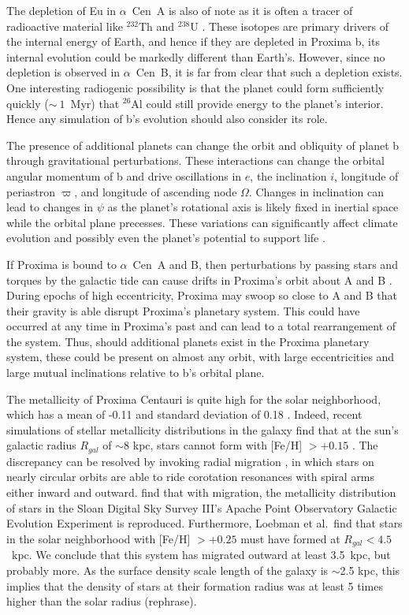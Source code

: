 \documentclass[preprint,12pt]{aastex}
\newcommand{\xxx}[1]{{\color{red} #1}} %
\def\acen{{$\alpha$~Cen}}
\begin{document}
The depletion of Eu in \acen~A is also of note as it is often a tracer
of radioactive material like $^{232}$Th and $^{238}$U
\citep{Young14}. These isotopes are primary drivers of the internal
energy of Earth, and hence if they are depleted in Proxima b, its
internal evolution could be markedly different than Earth's. However,
since no depletion is observed in \acen~B, it is far from clear that
such a depletion exists. One interesting radiogenic possibility is
that the planet could form sufficiently quickly ($\sim~1$~Myr) that
$^{26}$Al could still provide energy to the planet's interior. Hence any
simulation of b's evolution should also consider its role.

The presence of additional planets can change the orbit and obliquity
of planet b through gravitational perturbations. These interactions
can change the orbital angular momentum of b and drive oscillations in
$e$, the inclination $i$, longitude of periastron $\varpi$, and
longitude of ascending node $\Omega$. Changes in inclination can lead
to changes in $\psi$ as the planet's rotational axis is likely fixed
in inertial space while the orbital plane precesses. These variations
can significantly affect climate evolution and possibly even the
planet's potential to support life \citep{Armstrong14}.

If Proxima is bound to \acen~A and B, then perturbations by passing
stars and torques by the galactic tide can cause drifts in Proxima's
orbit about A and B \citep{Kaib13}. During epochs of high
eccentricity, Proxima may swoop so close to A and B that their gravity
is able disrupt Proxima's planetary system. This could have occurred
at any time in Proxima's past and can lead to a total rearrangement of
the system. Thus, should additional planets exist in the Proxima
planetary system, these could be present on almost any orbit, with large
eccentricities and large mutual inclinations relative to b's orbital plane.

The metallicity of Proxima Centauri is quite high for the solar
neighborhood, which has a mean of -0.11 and standard deviation of 0.18
\citep{AllendePrieto04}. Indeed, recent simulations of stellar
metallicity distributions in the galaxy find that at the sun's
galactic radius $R_{gal}$ of $\sim$8 kpc, stars cannot form with
[Fe/H] $> +0.15$ \citep{Loebman16}. The discrepancy can be resolved by
invoking radial migration \citep{SellwoodBinney02}, in which stars on
nearly circular orbits are able to ride corotation resonances with
spiral arms either inward and outward. \cite{Loebman16} find that with
migration, the metallicity distribution of stars in the Sloan Digital
Sky Survey III's Apache Point Observatory Galactic Evolution
Experiment \citep{Hayden15} is reproduced. Furthermore, Loebman et
al.\ find that stars in the solar neighborhood with [Fe/H] $> +0.25$
must have formed at $R_{gal} < 4.5$~kpc. We conclude that this system
has migrated outward at least 3.5~kpc, but probably more. As the surface
density scale length of the galaxy is $\sim$2.5 kpc, this implies that
the density of stars at their formation radius was at least 5 times
higher than \xxx{the solar radius (rephrase)}.
\end{document}
